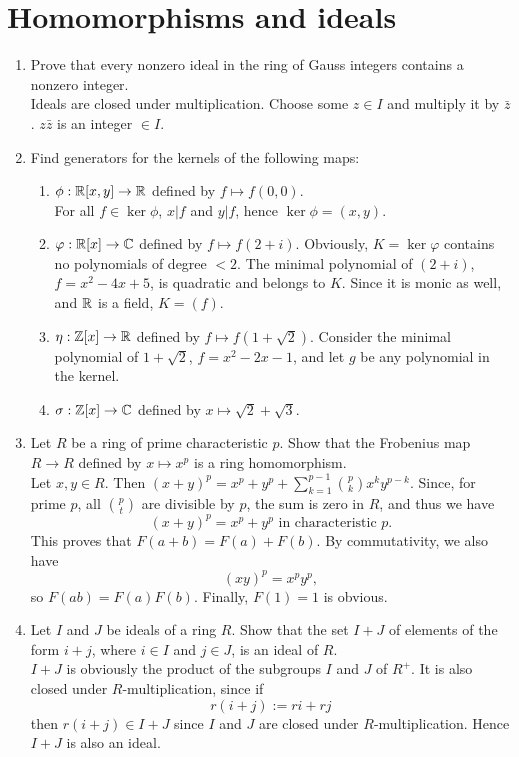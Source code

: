 \documentclass[13pt]{article}
\newcommand{\C}{\Bbb C}
\newcommand{\Z}{\Bbb Z}
\newcommand{\R}{\Bbb R}
\begin{document}
\section{Homomorphisms and ideals}
\begin{enumerate}
\item Prove that every nonzero ideal in the ring of Gauss integers contains a
  nonzero integer.\\
Ideals are closed under multiplication. Choose some $z\in I$ and multiply it by
$\bar z$. $z\bar z$ is an integer $\in I$.

\item Find generators for the kernels of the following maps:
\begin{enumerate}
  \item $\phi:\R[x,y]\to\R$ defined by $f\mapsto f(0,0)$.\\
  For all $f\in\ker\phi$, $x | f$ and $y | f$, hence $\ker\phi = (x,y)$.

  \item $\varphi:\R[x]\to\C$ defined by $f\mapsto f(2+i)$.
  Obviously, $K = \ker\varphi$ contains no polynomials of degree $<2$. The
  minimal polynomial of $(2+i)$, $f = x^2 - 4x + 5$, is quadratic and belongs to
  $K$. Since it is monic as well, and $\R$ is a field, $K = (f)$.

  \item $\eta:\Z[x]\to\R$ defined by $f\mapsto f(1+\sqrt 2)$.
  Consider the minimal polynomial of $1+\sqrt 2$, $f = x^2 - 2x - 1$, and let
  $g$ be any polynomial in the kernel.

  \item $\sigma:\Z[x]\to\C$ defined by $x\mapsto\sqrt 2 + \sqrt 3$.
  
\end{enumerate}

\item Let $R$ be a ring of prime characteristic $p$. Show that the Frobenius map
  $R\to R$ defined by $x\mapsto x^p$ is a ring homomorphism.\\
Let $x,y\in R$. Then $(x+y)^p = x^p + y^p +
\sum_{k=1}^{p-1}\binom{p}{k}x^ky^{p-k}$. Since, for prime $p$, all $\binom p t$
are divisible by $p$, the sum is zero in $R$, and thus we
have \[(x+y)^p=x^p+y^p\text{ in characteristic }p.\]
This proves that $F(a+b)=F(a)+F(b)$. By commutativity, we also have\[(xy)^p =
  x^py^p,\] so $F(ab)=F(a)F(b)$. Finally, $F(1)=1$ is obvious.

\item Let $I$ and $J$ be ideals of a ring $R$. Show that the set $I+J$ of
  elements of the form $i+j$, where $i\in I$ and $j\in J$, is an ideal of $R$.\\
$I+J$ is obviously the product of the subgroups $I$ and $J$ of $R^{+}$. It is
also closed under $R$-multiplication, since if \[r(i+j) := ri + rj\] then
$r(i+j)\in I+J$ since $I$ and $J$ are closed under $R$-multiplication. Hence
$I+J$ is also an ideal.


\end{enumerate}
\end{document}
